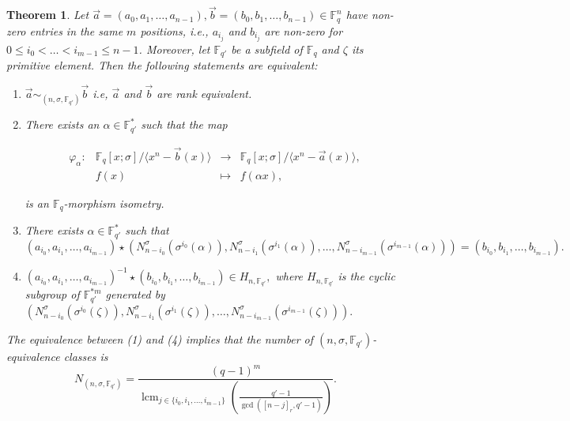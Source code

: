 \documentclass[12pt,paper]{article}
\theoremstyle{plain}
\newtheorem{theorem}{Theorem}[section] %
\newcommand{\Fq}{\mathbb{F}_{q}}
\DeclareMathOperator{\lcm}{lcm}
\begin{document}
\begin{theorem}
Let $ \vec{a}=(a_0,a_1,\ldots, a_{n-1}), \vec{b}=(b_0,b_1,\ldots, b_{n-1})\in \mathbb{F}_q^{n}$ have non-zero entries in the same $m$ positions, i.e., $a_{i_j}$ and $b_{i_j}$ are non-zero  for $0\leq i_0<\dots<i_{m-1}\leq n-1$. Moreover, let $ \mathbb{F}_{q'}$ be a subfield of $\Fq$ and 
$\zeta $ its primitive element. Then the following statements are equivalent:

\begin{enumerate}
    \item $ \vec{a} \sim_{(n,\sigma,\mathbb{F}_{q'})} \vec{b} $ i.e, $\vec{a} $ and $ \vec{b}$ are rank equivalent.
    \item There exists an $\alpha \in \mathbb{F}_{q'}^*$ such that the map

  \begin{equation}
  	\begin{array}{cccc}
  	\varphi_{\alpha}:& \mathbb{F}_q[x;\sigma] /\langle x^n-\vec{b}(x) \rangle  &\longrightarrow & \mathbb{F}_q[x;\sigma] /\langle x^n-\vec{a}(x) \rangle, \\ 
  	& f(x) & \longmapsto &  f(\alpha x),
  	\end{array}
  	\end{equation} 
    
is an  $\mathbb{F}_q$-morphism isometry.

   
     \item  There exists $\alpha\in \mathbb{F}_{q'}^* $ such that 
     $$ (a_{i_0}, a_{i_1},\ldots, a_{i_{m-1}})\star ( N_{n-i_0}^{\sigma}(\sigma^{i_0}(\alpha)), N_{n-i_1}^{\sigma}(\sigma^{i_1}(\alpha)),\ldots, N_{n-i_{m-1}}^{\sigma}(\sigma^{i_{m-1}}(\alpha)) ) =   ( b_{i_0}, b_{i_1},\ldots, b_{i_{m-1}}).$$
     
\item  $ (a_{i_0}, a_{i_1},\ldots, a_{i_{m-1}})^{-1}\star( b_{i_0}, b_{i_1},\ldots, b_{i_{m-1}}) \in H_{n, \mathbb{F}_{q'}},$ where $H_{n,\mathbb{F}_{q'}}$ is the cyclic subgroup of $\mathbb{F}_{q'}^{* m}$ generated by 
$( N_{n-i_0}^{\sigma}(\sigma^{i_0}(\zeta)), N_{n-i_1}^{\sigma}(\sigma^{i_1}(\zeta)),\ldots, N_{n-i_{m-1}}^{\sigma}(\sigma^{i_{m-1}}(\zeta)) ).$
\end{enumerate}
The equivalence between (1) and (4) implies that the number of $(n,\sigma,\mathbb{F}_{q'})$-equivalence classes is 
$$ 
N_{(n,\sigma,\mathbb{F}_{q'})}= \dfrac{ (q-1)^m}{ \lcm_{ j\in \{i_0,i_1,\ldots, i_{m-1} \} }\left(\frac{q'-1}{ \gcd([n-j]_r,q'-1)}\right)}. $$ 
\end{theorem}
\end{document}
